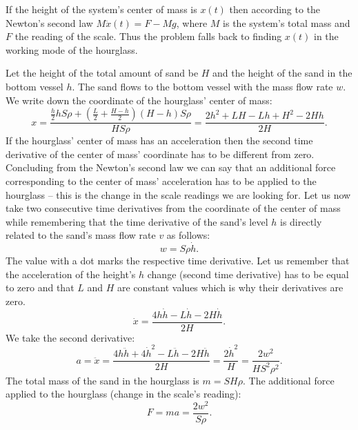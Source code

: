 \hinteng
If the height of the system’s center of mass is $x(t)$ then according to the Newton’s second law $M\ddot{x}(t) = F - Mg$, where $M$ is the system’s total mass and $F$ the reading of the scale. Thus the problem falls back to finding $x(t)$ in the working mode of the hourglass.

\solueng
Let the height of the total amount of sand be $H$ and the height of the sand in the bottom vessel $h$. The sand flows to the bottom vessel with the mass flow rate $w$.\\
We write down the coordinate of the hourglass’ center of mass:
\[x=\frac{\frac{h}{2}hS\rho+(\frac{L}{2}+\frac{H-h}{2})(H-h)S\rho}{HS\rho}=\frac{2h^2+LH-Lh+H^2-2Hh}{2H}.\] 
If the hourglass’ center of mass has an acceleration then the second time derivative of the center of mass’ coordinate has to be different from zero. Concluding from the Newton’s second law we can say that an additional force corresponding to the center of mass’ acceleration has to be applied to the hourglass – this is the change in the scale readings we are looking for. Let us now take two consecutive time derivatives from the coordinate of the center of mass while remembering that the time derivative of the sand’s level $h$ is directly related to the sand’s mass flow rate $v$ as follows:
\[w=S\rho\dot{h}.\] 
The value with a dot marks the respective time derivative. Let us remember that the acceleration of the height’s $h$ change (second time derivative) has to be equal to zero and that $L$ and $H$ are constant values which is why their derivatives are zero.
\[\dot{x}=\frac{4h\dot{h}-L\dot{h}-2H\dot{h}}{2H}.\] 
We take the second derivative:
\[a=\ddot{x}=\frac{4h\ddot{h}+4\dot{h}^2-L\ddot{h}-2H\ddot{h}}{2H}=\frac{2\dot{h}^2}{H}=\frac{2w^2}{HS^2\rho^2}.\] 
The total mass of the sand in the hourglass is $m=SH\rho$. The additional force applied to the hourglass (change in the scale’s reading):
\[F=ma=\frac{2w^2}{S\rho}.\]
\probend